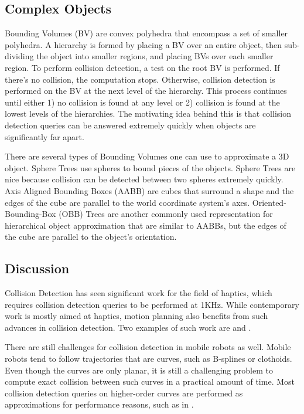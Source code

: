 \documentclass[10pt,conference]{ieeeconf}
\begin{document}
\subsection{Complex Objects}

	Bounding Volumes (BV) are convex polyhedra	that encompass a set of smaller polyhedra. A hierarchy is formed by placing a BV over an entire object, then sub-dividing the object into smaller regions, and placing BVs over each smaller region. To perform collision detection, a test on the root BV is performed. If there's no collision, the computation stops. Otherwise, collision detection is performed on the BV at the next level of the hierarchy. This process continues until either 1) no collision is found at any level or 2) collision is found at the lowest levels of the hierarchies. The motivating idea behind this is that collision detection queries can be answered extremely quickly when objects are significantly far apart. 
	
	There are several types of Bounding Volumes one can use to approximate a 3D object. Sphere Trees \cite{hubbard1996approximating} use spheres to bound pieces of the objects. Sphere Trees are nice because collision can be detected between two spheres extremely quickly. Axis Aligned Bounding Boxes (AABB) \cite{edelsbrunner1981intersection} are cubes that surround a shape and the edges of the cube are parallel to the world coordinate system's axes. Oriented-Bounding-Box (OBB) Trees \cite{gottschalk1996obbtree} are another commonly used representation for hierarchical object approximation that are similar to AABBs, but the edges of the cube are parallel to the object's orientation.
	 
	
\subsection{Discussion}

	Collision Detection has seen significant work for the field of haptics, which requires collision detection queries to be performed at 1KHz. While contemporary work is mostly aimed at haptics, motion planning also benefits from such advances in collision detection. Two examples of such work are \cite{otaduy2005sensation} and \cite{barbivc2008six}. 
	
	There are still challenges for collision detection in mobile robots as well. Mobile robots tend to follow trajectories that are curves, such as B-splines or clothoids. Even though the curves are only planar, it is still a challenging problem to compute exact collision between such curves in a practical amount of time. Most collision detection queries on higher-order curves are performed as approximations for performance reasons, such as in \cite{morken2009computing}.	
	
\end{document}
